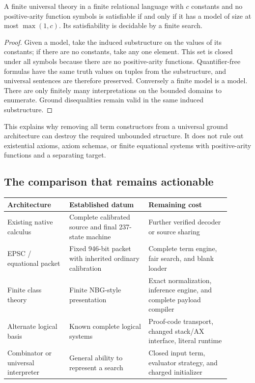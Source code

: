 \begin{proposition}
A finite universal theory in a finite relational language with $c$
constants and no positive-arity function symbols is satisfiable if and
only if it has a model of size at most $\max(1,c)$.  Its satisfiability
is decidable by a finite search.
\end{proposition}

\begin{proof}
Given a model, take the induced substructure on the values of its constants;
if there are no constants, take any one element.  This set is closed under
all symbols because there are no positive-arity functions.  Quantifier-free
formulas have the same truth values on tuples from the substructure,
and universal sentences are therefore preserved.  Conversely a finite
model is a model.  There are only finitely many interpretations on the
bounded domains to enumerate.  Ground disequalities remain valid in the
same induced substructure.
\end{proof}

This explains why removing all term constructors from a universal
ground architecture can destroy the required unbounded structure.
It does not rule out existential axioms, axiom schemas, or finite
equational systems with positive-arity functions and a separating target.

\subsection{The comparison that remains actionable}

\begin{center}\small
\begin{tabular}{p{0.25\linewidth}p{0.32\linewidth}p{0.33\linewidth}}
\toprule
Architecture & Established datum & Remaining cost\\\midrule
Existing native calculus & Complete calibrated source and final 237-state
machine & Further verified decoder or source sharing\\[3pt]
EPSC / equational packet & Fixed 946-bit packet with inherited ordinary
calibration & Complete term engine, fair search, and blank loader\\[3pt]
Finite class theory & Finite NBG-style presentation & Exact normalization,
inference engine, and complete payload compiler\\[3pt]
Alternate logical basis & Known complete logical systems & Proof-code
transport, changed stack/AX interface, literal runtime\\[3pt]
Combinator or universal interpreter & General ability to represent a search
& Closed input term, evaluator strategy, and charged initializer\\
\bottomrule
\end{tabular}
\end{center}

